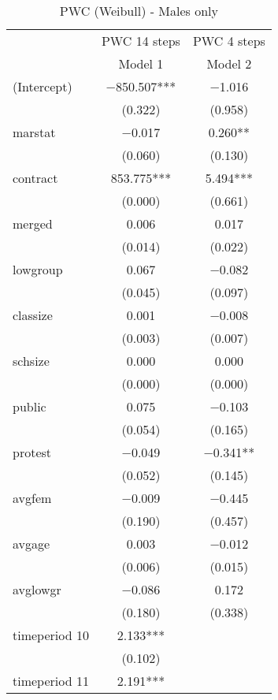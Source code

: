 \documentclass[
]{article}
\begin{document}
\begin{table}[!h]

\caption{\label{tab:unnamed-chunk-20}PWC (Weibull) - Males only}
\centering
\fontsize{8}{10}\selectfont
\begin{tabular}[t]{lcc}
\toprule
\multicolumn{1}{c}{ } & \multicolumn{1}{c}{PWC 14 steps} & \multicolumn{1}{c}{PWC 4 steps} \\
\cmidrule(l{3pt}r{3pt}){2-2} \cmidrule(l{3pt}r{3pt}){3-3}
  & Model 1 & Model 2\\
\midrule
(Intercept) & \num{-850.507}*** & \num{-1.016}\\
 & (\num{0.322}) & (\num{0.958})\\
marstat & \num{-0.017} & \num{0.260}**\\
 & (\num{0.060}) & (\num{0.130})\\
contract & \num{853.775}*** & \num{5.494}***\\
 & (\num{0.000}) & (\num{0.661})\\
merged & \num{0.006} & \num{0.017}\\
 & (\num{0.014}) & (\num{0.022})\\
lowgroup & \num{0.067} & \num{-0.082}\\
 & (\num{0.045}) & (\num{0.097})\\
classize & \num{0.001} & \num{-0.008}\\
 & (\num{0.003}) & (\num{0.007})\\
schsize & \num{0.000} & \num{0.000}\\
 & (\num{0.000}) & (\num{0.000})\\
public & \num{0.075} & \num{-0.103}\\
 & (\num{0.054}) & (\num{0.165})\\
protest & \num{-0.049} & \num{-0.341}**\\
 & (\num{0.052}) & (\num{0.145})\\
avgfem & \num{-0.009} & \num{-0.445}\\
 & (\num{0.190}) & (\num{0.457})\\
avgage & \num{0.003} & \num{-0.012}\\
 & (\num{0.006}) & (\num{0.015})\\
avglowgr & \num{-0.086} & \num{0.172}\\
 & (\num{0.180}) & (\num{0.338})\\
timeperiod 10 & \num{2.133}*** & \\
 & (\num{0.102}) & \\
timeperiod 11 & \num{2.191}*** & \\

\end{tabular}
\end{table}
\end{document}
